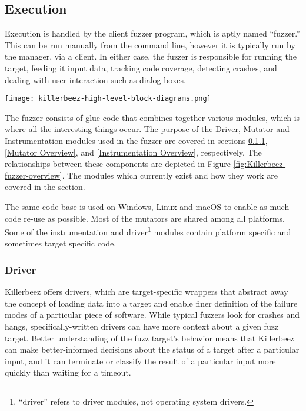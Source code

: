 \subsection{Execution}
Execution is handled by the client fuzzer program, which is aptly named ``fuzzer.''
This can be run manually from the command line, however it is typically run by
the manager, via a \BOINC{} client.  In either case, the fuzzer is responsible
for running the target, feeding it input data, tracking code
coverage, detecting crashes, and dealing with user interaction such as dialog
boxes.

\begin{figure*}[!ht]
\centering
\texttt{[image: killerbeez-high-level-block-diagrams.png]}
\caption{Killerbeez Fuzzer Overview}
\label{fig:Killerbeez-fuzzer-overview}
\end{figure*}

The fuzzer consists of glue code that combines together various
modules, which is where all the interesting things occur. The purpose of
the Driver, Mutator and Instrumentation modules used in the fuzzer are covered in sections
\ref{Driver Overview}, \ref{Mutator Overview}, and
\ref{Instrumentation Overview}, respectively.  The relationships between these components are depicted in Figure \ref{fig:Killerbeez-fuzzer-overview}. The modules which currently
exist and how they work are covered in the 
section.

The same code base is used on Windows, Linux and macOS to enable as much code
re-use as possible.  Most of the mutators are shared among all platforms.
Some of the instrumentation and driver\footnote{
``driver'' refers to driver modules, not operating system drivers.}
modules contain platform specific and sometimes target specific code.

\subsubsection{Driver} \label{Driver Overview}
Killerbeez offers drivers, which are target-specific wrappers that abstract
away the concept of loading data into a target and enable finer
definition of the failure modes of a particular piece of software. While
typical fuzzers look for crashes and hangs, specifically-written drivers can
have more context about a given fuzz target.  Better understanding of the fuzz
target's behavior means that Killerbeez can make better-informed decisions
about the status of a target after a particular input, and it can terminate or
classify the result of a particular input more quickly than waiting for a
timeout.

